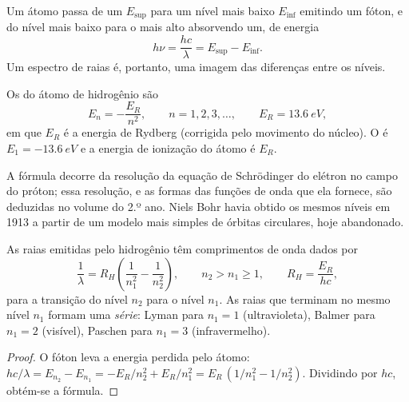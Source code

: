 Um átomo passa de um  $E_{\text{sup}}$ para um nível mais
baixo $E_{\text{inf}}$ emitindo um fóton, e do nível mais baixo para o
mais alto absorvendo um, de energia
\[
  h\nu = \frac{hc}{\lambda} = E_{\text{sup}} - E_{\text{inf}} .
\]
Um espectro de raias é, portanto, uma imagem das diferenças entre os
níveis.

\begin{theorem}\label{thm:b1:quantum-numbers:levels}
Os  do átomo de hidrogênio são
\[
  E_n = -\frac{E_R}{n^2}, \qquad n = 1, 2, 3, \dots,
  \qquad E_R = \qty{13.6}{eV},
\]
em que $E_R$ é a energia de Rydberg (corrigida pelo movimento do
núcleo). O  é $E_1 = \qty{-13.6}{eV}$ e a energia de
ionização do átomo é $E_R$.
\end{theorem}
\admitted

\begin{remark}\label{rem:b1:quantum-numbers:schrodinger}
A fórmula decorre da resolução da equação de Schrödinger do elétron no
campo do próton; essa resolução, e as formas das funções de onda que
ela fornece, são deduzidas no volume do 2.º ano. Niels Bohr havia
obtido os mesmos níveis em 1913 a partir de um modelo mais simples de
órbitas circulares, hoje abandonado.
\end{remark}

\begin{proposition}\label{prop:b1:quantum-numbers:rydberg}
As raias emitidas pelo hidrogênio têm comprimentos de onda dados por
\[
  \frac{1}{\lambda} = R_H\left(\frac{1}{n_1^2} - \frac{1}{n_2^2}\right),
  \qquad n_2 > n_1 \ge 1, \qquad R_H = \frac{E_R}{hc},
\]
para a transição do nível $n_2$ para o nível $n_1$. As raias que
terminam no mesmo nível $n_1$ formam uma \emph{série}: Lyman para $n_1 = 1$
(ultravioleta), Balmer para $n_1 = 2$ (visível), Paschen para $n_1 = 3$
(infravermelho).
\end{proposition}

\begin{proof}
O fóton leva a energia perdida pelo átomo:
$hc/\lambda = E_{n_2} - E_{n_1} = -E_R/n_2^2 + E_R/n_1^2
= E_R\,(1/n_1^2 - 1/n_2^2)$. Dividindo por $hc$, obtém-se a fórmula.
\end{proof}

